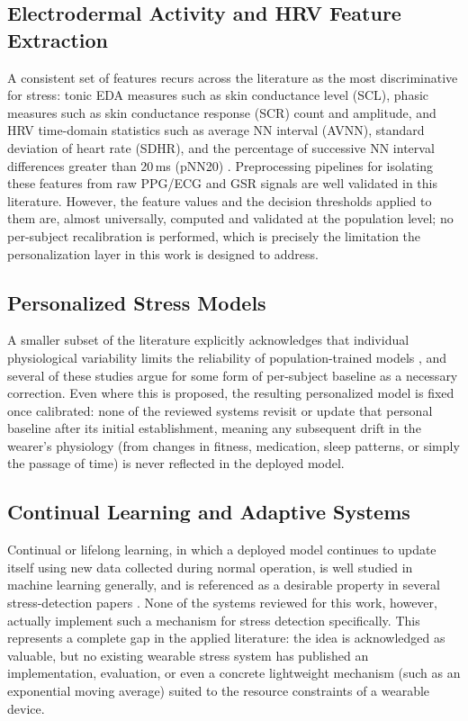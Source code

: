 \documentclass[conference]{IEEEtran}
\begin{document}
\subsection{Electrodermal Activity and HRV
Feature Extraction}
A consistent set of features recurs across the literature as
the most discriminative for stress: tonic EDA measures such
as skin conductance level (SCL), phasic measures such as skin
conductance response (SCR) count and amplitude, and HRV
time-domain statistics such as average NN interval (AVNN),
standard deviation of heart rate (SDHR), and the percentage of
successive NN interval differences greater than 20\,ms
(pNN20) \cite{b2}\cite{b5}\cite{b7}\cite{b12}. Preprocessing
pipelines for isolating these features from raw PPG/ECG and
GSR signals are well validated in this literature. However,
the feature values and the decision thresholds applied to
them are, almost universally, computed and validated at the
population level; no per-subject recalibration is performed,
which is precisely the limitation the personalization layer
in this work is designed to address.

\subsection{Personalized Stress Models}
A smaller subset of the literature explicitly acknowledges
that individual physiological variability limits the
reliability of population-trained models
\cite{b6}\cite{b8}\cite{b9}\cite{b11}, and several of these
studies argue for some form of per-subject baseline as a
necessary correction. Even where this is proposed, the
resulting personalized model is fixed once calibrated: none
of the reviewed systems revisit or update that personal
baseline after its initial establishment, meaning any
subsequent drift in the wearer's physiology (from changes in
fitness, medication, sleep patterns, or simply the passage of
time) is never reflected in the deployed model.

\subsection{Continual Learning and Adaptive Systems}
Continual or lifelong learning, in which a deployed model
continues to update itself using new data collected during
normal operation, is well studied in machine learning
generally, and is referenced as a desirable property in
several stress-detection papers \cite{b3}\cite{b4}\cite{b6}.
None of the systems reviewed for this work, however, actually
implement such a mechanism for stress detection specifically.
This represents a complete gap in the applied literature: the
idea is acknowledged as valuable, but no existing wearable
stress system has published an implementation, evaluation, or
even a concrete lightweight mechanism (such as an
exponential moving average) suited to the resource constraints
of a wearable device.
\end{document}
